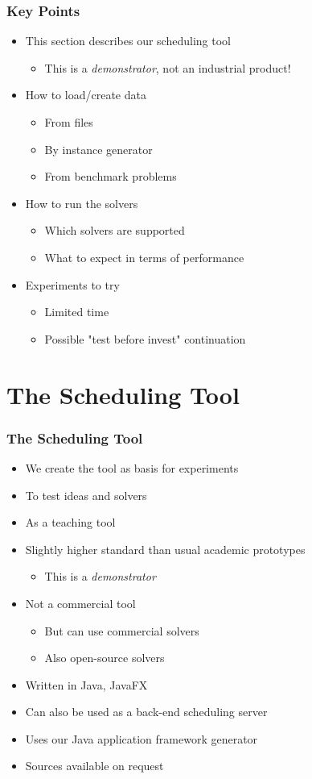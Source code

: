 \begin{frame}
\frametitle{Key Points}
\begin{itemize}
\item This section describes our scheduling tool
\begin{itemize}
\item This is a \emph{demonstrator}, not an industrial product!
\end{itemize}
\item How to load/create data
\begin{itemize}
\item From files
\item By instance generator
\item From benchmark problems
\end{itemize}
\item How to run the solvers
\begin{itemize}
\item Which solvers are supported
\item What to expect in terms of performance
\end{itemize}
\item Experiments to try
\begin{itemize}
\item Limited time
\item Possible "test before invest" continuation
\end{itemize}

\end{itemize}
\end{frame}

\section{The Scheduling Tool}

\begin{frame}
\frametitle{The Scheduling Tool}
\begin{itemize}
\item We create the tool as basis for experiments
\item To test ideas and solvers
\item As a teaching tool
\item Slightly higher standard than usual academic prototypes
\begin{itemize}
\item This is a \emph{demonstrator}
\end{itemize}
\item Not a commercial tool
\begin{itemize}
\item But can use commercial solvers
\item Also open-source solvers
\end{itemize}
\item Written in Java, JavaFX
\item Can also be used as a back-end scheduling server
\item Uses our Java application framework generator
\item Sources available on request
\end{itemize}
\end{frame}




